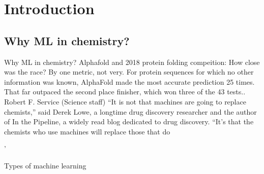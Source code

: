 \section{Introduction}
\subsection{Why ML in chemistry?}
\begin{frame}{Why ML in chemistry?}
Alphafold and 2018 protein folding compeition:
How close was the race? By one metric, not very. For protein sequences for which no other information was known, AlphaFold made the most accurate prediction 25 times. That far outpaced the second place finisher, which won three of the 43 tests.. 
Robert F. Service (Science staff)
“It is not that machines are going to replace chemists,” said Derek Lowe, a longtime drug discovery researcher and the author of In the Pipeline, a widely read blog dedicated to drug discovery. “It’s that the chemists who use machines will replace those that do
\end{frame}'
\begin{frame}[t]{Types of machine learning}
%
\end{frame}
